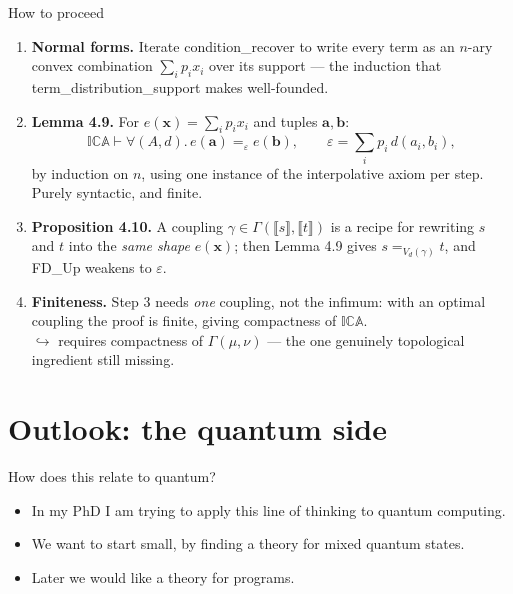 \documentclass[10pt,aspectratio=169]{beamer}
\newcommand{\qeq}[1]{=_{#1}}
\newcommand{\den}[1]{\llbracket #1 \rrbracket}
\newcommand{\ICA}{\mathbb{I}\mathbb{C}\mathbb{A}}
\newcommand{\eps}{\varepsilon}
\newcommand{\Cpl}{\Gamma}
\newcommand{\rid}[1]{{\ttfamily\small #1}}
\begin{document}
\begin{frame}{How to proceed}
  \begin{enumerate}
    \item \textbf{Normal forms.} Iterate \rid{condition\_recover} to
      write every term as an $n$-ary convex combination
      $\sum_i p_i x_i$ over its support --- the induction that
      \rid{term\_distribution\_support} makes well-founded.
      \medskip
    \item \textbf{Lemma 4.9.} For $e(\bm x) = \sum_i p_i x_i$ and
      tuples $\bm a, \bm b$:
      \[
        \ICA \vdash \forall(A,d).\, e(\bm a) \qeq{\eps} e(\bm b),
        \qquad \eps = \textstyle\sum_i p_i\, d(a_i,b_i),
      \]
      by induction on $n$, using one instance of the interpolative
      axiom per step. Purely syntactic, and finite.
      \medskip
    \item \textbf{Proposition 4.10.} A coupling $\gamma \in
      \Cpl(\den{s},\den{t})$ is a recipe for rewriting $s$ and $t$ into
      the \emph{same shape} $e(\bm x)$; then Lemma 4.9 gives
      $s \qeq{V_d(\gamma)} t$, and \rid{FD\_Up} weakens to $\eps$.
      \medskip
    \item \textbf{Finiteness.} Step 3 needs \emph{one} coupling, not the
      infimum: with an optimal coupling the proof is finite, giving
      compactness of $\ICA$. \\
      {\small $\hookrightarrow$ requires compactness of
      $\Cpl(\mu,\nu)$ --- the one genuinely topological ingredient
      still missing.}
  \end{enumerate}
\end{frame}

\section{Outlook: the quantum side}

\begin{frame}{How does this relate to quantum?}
  \begin{itemize}
    \item[--] In my PhD I am trying to apply this line of thinking to
      quantum computing.
      \medskip
    \item[--] We want to start small, by finding a theory for
      mixed quantum states.
      \medskip
    \item[--] Later we would like a theory for programs.
  \end{itemize}
\end{frame}
\end{document}
